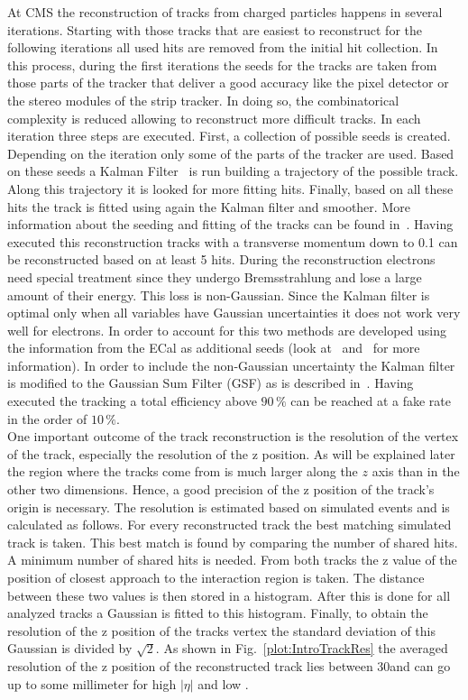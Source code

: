 At CMS the reconstruction of tracks from charged particles happens in several iterations. Starting with those tracks that are easiest to reconstruct for the following iterations all used hits are removed from the initial hit collection. In this process, during the first iterations the seeds for the tracks are taken from those parts of the tracker that deliver a good accuracy like the pixel detector or the stereo modules of the strip tracker. In doing so, the combinatorical complexity is reduced allowing to reconstruct more difficult tracks. In each iteration three steps are executed. First, a collection of possible seeds is created. Depending on the iteration only some of the parts of the tracker are used. Based on these seeds a Kalman Filter~\cite{Fruhwirth:1987fm} is run building a trajectory of the possible track. Along this trajectory it is looked for more fitting hits. Finally, based on all these hits the track is fitted using again the Kalman filter and smoother. More information about the seeding and fitting of the tracks can be found in~. Having executed this reconstruction tracks with a transverse momentum down to 0.1\GeVc{} can be reconstructed based on at least 5 hits. During the reconstruction electrons need special treatment since they undergo Bremsstrahlung and lose a large amount of their energy. This loss is non-Gaussian. Since the Kalman filter is optimal only when all variables have Gaussian uncertainties it does not work very well for electrons. In order to account for this two methods are developed using the information from the ECal as additional seeds (look at~ and~ for more information). In order to include the non-Gaussian uncertainty the Kalman filter is modified to the Gaussian Sum Filter (GSF) as is described in~. Having executed the tracking a total efficiency above $90\,\%$ can be reached at a fake rate in the order of $10\,\%$. \\
One important outcome of the track reconstruction is the resolution of the vertex of the track, especially the resolution of the z position. As will be explained later the region where the tracks come from is much larger along the $z$ axis than in the other two dimensions. Hence, a good precision of the z position of the track's origin is necessary. The resolution is estimated based on simulated events and is calculated as follows. For every reconstructed track the best matching simulated track is taken. This best match is found by comparing the number of shared hits. A minimum number of shared hits is needed. From both tracks the z value of the position of closest approach to the interaction region is taken. The distance between these two values is then stored in a histogram. After this is done for all analyzed tracks a Gaussian is fitted to this histogram. Finally, to obtain the resolution of the z position of the tracks vertex the standard deviation of this Gaussian is divided by $\sqrt{2}$.  As shown in Fig.~\ref{plot:IntroTrackRes} the averaged resolution of the z position of the reconstructed track lies between 30\mum and can go up to some millimeter for high $\left|\eta\right|$ and low \pt{}.


